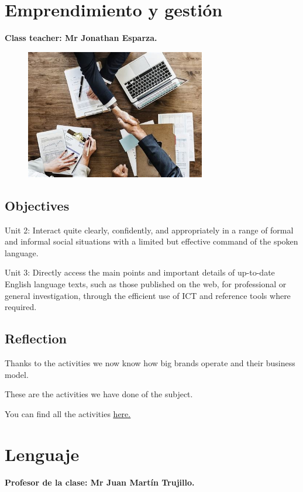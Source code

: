 \documentclass[a4paper, 12pt]{article}
\begin{document}
\section{Emprendimiento y gestión}
\textbf{Class teacher: Mr Jonathan Esparza.}

\begin{figure}[h]
  \includegraphics[width=0.7\textwidth, center]{business.jpeg}
\end{figure}

\subsection{Objectives}

Unit 2: Interact quite clearly, confidently, and appropriately in a range of formal and informal social situations with a limited but effective command of the spoken language.

Unit 3: Directly access the main points and important details of up-to-date English language texts, such as those published on the web, for professional or general investigation, through the efficient use of ICT and reference tools where required.

\subsection{Reflection}

Thanks to the activities we now know how big brands operate and their business model.

These are the activities we have done of the subject.

You can find all the activities \href{https://drive.google.com/drive/folders/1-Z9c3tXC08xXmIgc4JyYJ2_XrgSEcQSL?usp=sharing}{\underline{here.}}

\section{Lenguaje}
\textbf{Profesor de la clase: Mr Juan Martín Trujillo.}
\end{document}
